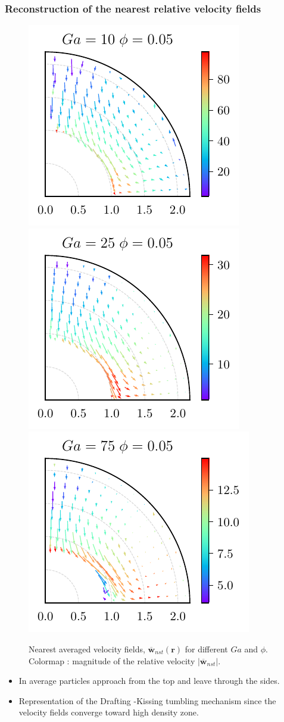 \documentclass{sintefbeamer}
\newcommand{\nstavg}[1]{\overline{#1}_{nst}}
\begin{document}
\begin{frame}
  \frametitle{Reconstruction of the nearest relative velocity fields}

  \begin{figure}
    
    \includegraphics[height=0.25\textwidth]{image/HOMOGENEOUS/fDrop/U_mu_r_0_1_Ga_10_PHI_0_05.pdf}
    \includegraphics[height=0.25\textwidth]{image/HOMOGENEOUS/fDrop/U_mu_r_0_1_Ga_25_PHI_0_05.pdf}
    \includegraphics[height=0.25\textwidth]{image/HOMOGENEOUS/fDrop/U_mu_r_0_1_Ga_75_PHI_0_05.pdf}
    
    \caption{Nearest averaged velocity fields, $\nstavg{\textbf{w}} (\textbf{r})$ for different $Ga$ and $\phi$. 
    Colormap : magnitude of the relative velocity $|\nstavg{\textbf{w}}|$. }
  \end{figure}

\begin{itemize}
  \item In average particles approach from the top and leave through the sides. 
  \item Representation of the Drafting -Kissing tumbling mechanism since the velocity fields converge toward high density zone. 
\end{itemize}
\end{frame}
\end{document}
